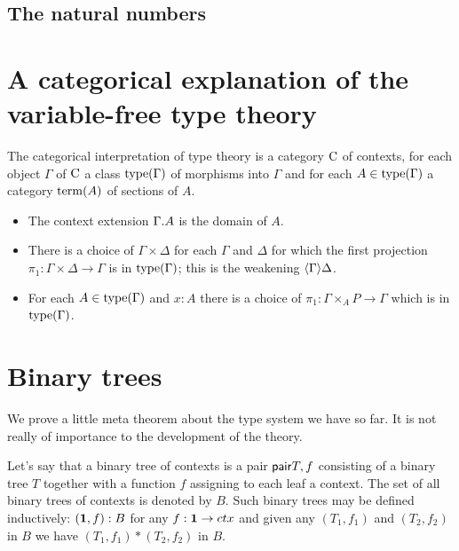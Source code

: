 \subsection{The natural numbers}

\section{A categorical explanation of the variable-free type theory}

The categorical interpretation of type theory is a category $\mathrm{C}$ of
contexts, for each object $\Gamma$ of $\mathrm{C}$ a class $\mathrm{type}(\Gamma)$
of morphisms into $\Gamma$ and for each $A\in\mathrm{type}(\Gamma)$ a category
$\mathrm{term}(A)$ of sections of $A$. 

\begin{itemize}
\item The context extension $\ctxext{\Gamma}{A}$ is the domain of $A$.
\item There is a choice of $\Gamma\times\Delta$ for each $\Gamma$ and $\Delta$
      for which the first projection $\pi_1:\Gamma\times\Delta\to\Gamma$ is in $\mathrm{type}(\Gamma)$;
      this is the weakening $\ctxwk{\Gamma}{\Delta}$.
\item For each $A\in\mathrm{type}(\Gamma)$ and $x:A$ there is a choice of
      $\pi_1:\Gamma\times_A P\to\Gamma$ which is in $\mathrm{type}(\Gamma)$.
\end{itemize}

\section{Binary trees}
We prove a little meta theorem about the type system we have so far. It is not
really of importance to the development of the theory. 

Let's say
that a binary tree of contexts is a pair $\mathsf{pair}{T,f}$ consisting of a binary 
tree $T$ together with a function $f$ assigning to each leaf a context. The set
of all binary trees of contexts is denoted by $B$. Such
binary trees may be defined inductively: $(\mathbf{1},f):B$ for any $f:\mathbf{1}\to ctx$
and given any $(T_1,f_1)$ and $(T_2,f_2)$ in $B$ we have $(T_1,f_1)*(T_2,f_2)$
in $B$.

